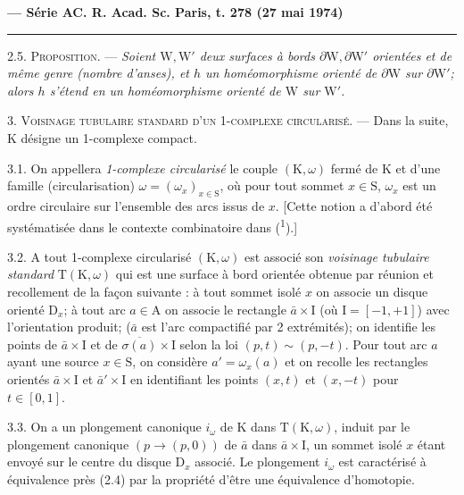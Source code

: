 \textbf{--- Série A}\hfill\textbf{C. R. Acad. Sc. Paris, t. 278 (27 mai 1974)}\par\noindent\rule{\linewidth}{.35pt}\par

2.5. \textsc{Proposition.} --- \textit{Soient \(\mathrm{W},\mathrm{W}'\) deux surfaces à bords \(\partial\mathrm{W},\partial\mathrm{W}'\) orientées et de même genre (nombre d'anses), et \(h\) un homéomorphisme orienté de \(\partial\mathrm{W}\) sur \(\partial\mathrm{W}'\); alors \(h\) s'étend en un homéomorphisme orienté de \(\mathrm{W}\) sur \(\mathrm{W}'\).}

3. \textsc{Voisinage tubulaire standard d'un 1-complexe circularisé.} --- Dans la suite, \(\mathrm{K}\) désigne un 1-complexe compact.

3.1. On appellera \textit{1-complexe circularisé} le couple \((\mathrm{K},\omega)\) fermé de \(\mathrm{K}\) et d'une famille (circularisation) \(\omega=(\omega_x)_{x\in\mathrm{S}}\), où pour tout sommet \(x\in\mathrm{S}\), \(\omega_x\) est un ordre circulaire sur l'ensemble des arcs issus de \(x\). [Cette notion a d'abord été systématisée dans le contexte combinatoire dans (\textsuperscript{1}).]

3.2. A tout 1-complexe circularisé \((\mathrm{K},\omega)\) est associé son \textit{voisinage tubulaire standard} \(\mathrm{T}(\mathrm{K},\omega)\) qui est une surface à bord orientée obtenue par réunion et recollement de la façon suivante : à tout sommet isolé \(x\) on associe un disque orienté \(\mathrm{D}_x\); à tout arc \(a\in\mathrm{A}\) on associe le rectangle \(\bar a\times\mathrm{I}\) (où \(\mathrm{I}=[-1,+1]\)) avec l'orientation produit; (\(\bar a\) est l'arc compactifié par 2 extrémités); on identifie les points de \(\bar a\times\mathrm{I}\) et de \(\overline{\sigma(a)}\times\mathrm{I}\) selon la loi \((p,t)\sim(p,-t)\). Pour tout arc \(a\) ayant une source \(x\in\mathrm{S}\), on considère \(a'=\omega_x(a)\) et on recolle les rectangles orientés \(\bar a\times\mathrm{I}\) et \(\bar a'\times\mathrm{I}\) en identifiant les points \((x,t)\) et \((x,-t)\) pour \(t\in[0,1]\).

3.3. On a un plongement canonique \(i_\omega\) de \(\mathrm{K}\) dans \(\mathrm{T}(\mathrm{K},\omega)\), induit par le plongement canonique \((p\to(p,0))\) de \(\bar a\) dans \(\bar a\times\mathrm{I}\), un sommet isolé \(x\) étant envoyé sur le centre du disque \(\mathrm{D}_x\) associé. Le plongement \(i_\omega\) est caractérisé à équivalence près (2.4) par la propriété d'être une équivalence d'homotopie.


